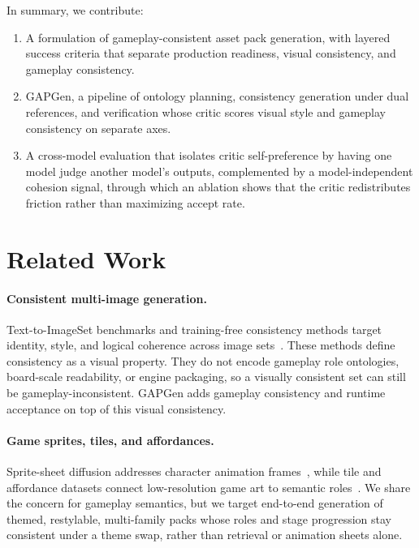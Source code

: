 \documentclass{article}
\begin{document}
In summary, we contribute:
\begin{enumerate}[leftmargin=*,itemsep=2pt]
  \item A formulation of gameplay-consistent asset pack generation, with layered success criteria
        that separate production readiness, visual consistency, and gameplay consistency.
  \item GAPGen, a pipeline of ontology planning, consistency generation under dual references, and
        verification whose critic scores visual style and gameplay consistency on separate axes.
  \item A cross-model evaluation that isolates critic self-preference by having one model judge
        another model's outputs, complemented by a model-independent cohesion signal, through which
        an ablation shows that the critic redistributes friction rather than maximizing accept rate.
\end{enumerate}

\section{Related Work}
\label{sec:related}

\paragraph{Consistent multi-image generation.}
Text-to-ImageSet benchmarks and training-free consistency methods target identity, style, and
logical coherence across image sets~\cite{jia2025t2is,consistyle2025}.
These methods define consistency as a visual property.
They do not encode gameplay role ontologies, board-scale readability, or engine packaging, so a
visually consistent set can still be gameplay-inconsistent.
GAPGen adds gameplay consistency and runtime acceptance on top of this visual consistency.

\paragraph{Game sprites, tiles, and affordances.}
Sprite-sheet diffusion addresses character animation frames~\cite{spritesheet2024}, while
tile and affordance datasets connect low-resolution game art to semantic roles~\cite{gametilenet2024}.
We share the concern for gameplay semantics, but we target end-to-end generation of themed,
restylable, multi-family packs whose roles and stage progression stay consistent under a theme
swap, rather than retrieval or animation sheets alone.
\end{document}
